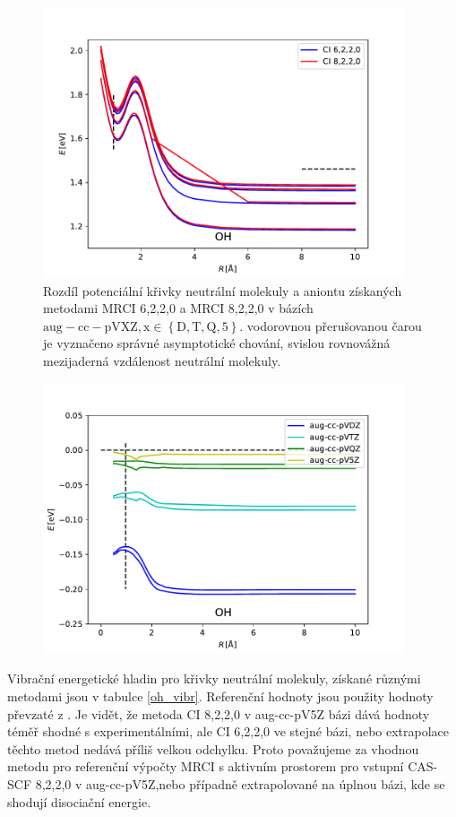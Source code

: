 \begin{figure}
\centering
\includegraphics[width=0.95\textwidth]{../img/OH-lin.pdf}
\caption{Rozdíl potenciální křivky neutrální molekuly a aniontu získaných metodami MRCI 
6,2,2,0 a MRCI 8,2,2,0 v bázích $\mathrm{aug-cc-pVXZ, x \in \left\lbrace D,T,Q,5\right
\rbrace }$. vodorovnou přerušovanou čarou je vyznačeno správné asymptotické chování, 
svislou rovnovážná mezijaderná vzdálenost neutrální molekuly.}
\label{grOHlin}
\end{figure}

\begin{figure}
\centering
\includegraphics[width=0.95\textwidth]{../img/OH-lin-dif.pdf}
\caption{\TD}
\label{grOHlindif}
\end{figure}

Vibrační energetické hladin pro křivky neutrální molekuly, získané různými metodami 
jsou v tabulce \ref{oh_vibr}. Referenční hodnoty jsou použity hodnoty převzaté z 
\cite{OH_vibr}. Je vidět, že metoda CI 8,2,2,0 v aug-cc-pV5Z bázi  dává hodnoty téměř shodné s experimentálními, ale CI 6,2,2,0 ve stejné bázi, nebo extrapolace těchto metod nedává příliš velkou odchylku. 
Proto  považujeme za vhodnou metodu pro referenční výpočty MRCI s aktivním prostorem pro vstupní CAS-SCF 8,2,2,0 v aug-cc-pV5Z,nebo případně extrapolované na úplnou bázi, kde se shodují disociační energie.

